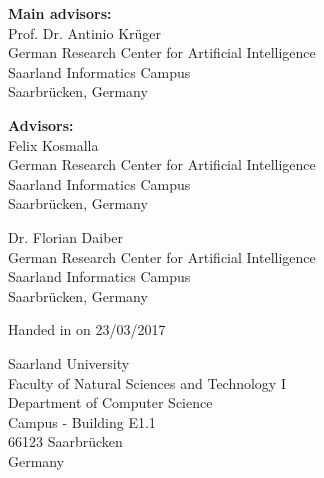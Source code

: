 \pagestyle{empty}

\vspace*{0.5cm}
\textbf{Main advisors:}\\
Prof. Dr. Antinio Krüger\\
German Research Center for Artificial Intelligence\\
Saarland Informatics Campus\\
Saarbrücken, Germany

\vspace*{0.5cm}
\textbf{Advisors:}\\
Felix Kosmalla\\
German Research Center for Artificial Intelligence\\
Saarland Informatics Campus\\
Saarbrücken, Germany

\vspace*{0.5cm}
Dr. Florian Daiber\\
German Research Center for Artificial Intelligence\\
Saarland Informatics Campus\\
Saarbrücken, Germany


\vspace{3.5cm}
Handed in on 23/03/2017


\vspace{1.5cm}


\vspace{3cm}
Saarland University\\
Faculty of Natural Sciences and Technology I\\
Department of Computer Science\\
Campus - Building E1.1\\
66123 Saarbrücken\\
Germany\\


